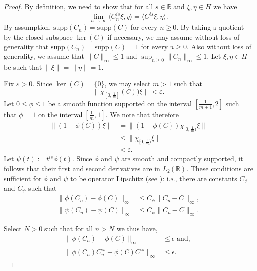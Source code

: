     \begin{proof} 
        By definition, we need to show that for all $s \in \mathbb{R}$ and $\xi,\eta \in H$ we have
        \begin{equation*}
            \lim_{n\to\infty} \langle C_n^{is}\xi,\eta\rangle = \langle C^{is}\xi,\eta\rangle.
        \end{equation*}
        By assumption, $\mathrm{supp}(C_n) = \mathrm{supp}(C)$ for every $n\geq0.$ 
        By taking a quotient by the closed subspace $\ker(C)$ if necessary, we may assume without loss of generality that $\mathrm{supp}(C_n)=\mathrm{supp}(C)=1$
        for every $n\geq0.$ Also without loss of generality, we assume that $\|C\|_{\infty}\leq 1$ and $\sup_{n\geq 0}\|C_n\|_{\infty}\leq 1$. Let $\xi ,\eta \in H$ be such
        that $\|\xi\| = \|\eta\| = 1$.

        Fix $\varepsilon>0$. { Since $\ker(C) = \{0\}$, we may} select $m > 1$ such that
        $$\|\chi_{[0,\frac1m]}(C))\xi\|<\varepsilon.$$
        Let $0\leq\phi\leq1$ be a smooth function supported on the interval $[\frac1{m+1},2]$ such that $\phi=1$ on the interval $[\frac1m,1].$
        We note that therefore 
        \begin{align*}
            \|(1-\phi(C))\xi\| &= \|(1-\phi(C))\chi_{[0,\frac{1}{m})}\xi\|\\
                               &\leq \|\chi_{[0,\frac{1}{m})}\xi\|\\
                               &< \varepsilon.
        \end{align*}
        Let $\psi(t) := t^{is}\phi(t)$. Since $\phi$ and $\psi$ are smooth and compactly supported, it follows that their first and second derivatives are in $L_2(\mathbb{R})$. 
        These conditions are sufficient for $\phi$ and $\psi$ to be operator Lipschitz (see \cite[Lemma 6, Lemma 7]{PS-crelle}): i.e.,
        there are constants $C_{\phi}$ and $C_{\psi}$ such that
        \begin{align*}
            \|\phi(C_n)-\phi(C)\|_\infty &\leq C_{\phi}\|C_n-C\|_\infty,\\
            \|\psi(C_n)-\psi(C)\|_\infty &\leq C_{\psi}\|C_n-C\|_\infty.
        \end{align*}
        
        Select $N> 0$ such that for all $n > N$ we thus have,
        \begin{align*}
                          \|\phi(C_n)-\phi(C)\|_{\infty} &\leq \epsilon \text{ and, }\\
            \|\phi(C_n)C_n^{is}-\phi(C)C^{is}\|_{\infty} &\leq \epsilon.
        \end{align*}


\end{proof}
